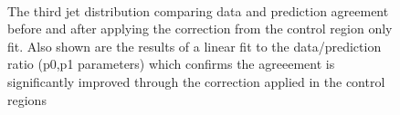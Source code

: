 \begin{figure}[tbhp]
\begin{center}
        \\
        \caption{The third jet \pt distribution comparing data and prediction agreement before and after applying the correction from the control region only fit. Also shown are the results of a linear fit to the data/prediction ratio (p0,p1 parameters) which confirms the agreeement is significantly improved through the correction applied in the control regions}
    \end{center}
\end{figure}
